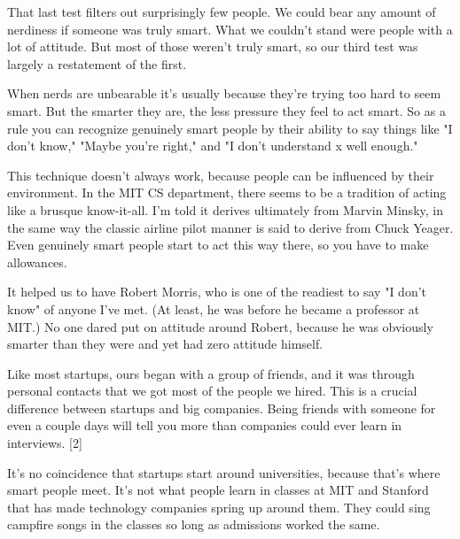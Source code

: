 That
                    last test filters out surprisingly few people. We could bear
                    any amount of nerdiness if someone was truly smart. What we
                    couldn't stand were people with a lot of attitude. But most
                    of those weren't truly smart, so our third test was largely
                    a restatement of the first.

When nerds are
                    unbearable it's usually because they're trying too hard to
                    seem smart. But the smarter they are, the less pressure they
                    feel to act smart. So as a rule you can recognize genuinely
                    smart people by their ability to say things like "I don't
                    know," "Maybe you're right," and "I don't understand x well
                    enough."

This technique doesn't always work,
                    because people can be influenced by their environment. In
                    the MIT CS department, there seems to be a tradition of
                    acting like a brusque know-it-all. I'm told it derives
                    ultimately from Marvin Minsky, in the same way the classic
                    airline pilot manner is said to derive from Chuck Yeager.
                    Even genuinely smart people start to act this way there, so
                    you have to make allowances.

It helped us to have
                    Robert Morris, who is one of the readiest to say "I don't
                    know" of anyone I've met. (At least, he was before he became
                    a professor at MIT.) No one dared put on attitude around
                    Robert, because he was obviously smarter than they were and
                    yet had zero attitude himself.

Like most
                    startups, ours began with a group of friends, and it was
                    through personal contacts that we got most of the people we
                    hired. This is a crucial difference between startups and big
                    companies. Being friends with someone for even a couple days
                    will tell you more than companies could ever learn in
                    interviews. [2]

It's no coincidence that startups
                    start around universities, because that's where smart people
                    meet. It's not what people learn in classes at MIT and
                    Stanford that has made technology companies spring up around
                    them. They could sing campfire songs in the classes so long
                    as admissions worked the same.

